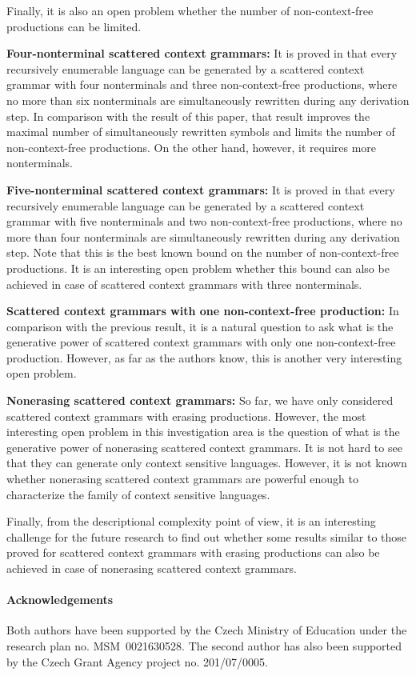 \documentclass[copyright]{eptcs}
\begin{document}
  Finally, it is also an open problem whether the number of non-context-free productions can be limited.

  {\bf Four-nonterminal scattered context grammars:}
  It is proved in \cite{masopustTCS} that every recursively enumerable language can be generated by a scattered context grammar with four nonterminals and three non-context-free productions, where no more than six nonterminals are simultaneously rewritten during any derivation step. In comparison with the result of this paper, that result improves the maximal number of simultaneously rewritten symbols and limits the number of non-context-free productions. On the other hand, however, it requires more nonterminals.

  {\bf Five-nonterminal scattered context grammars:}
  It is proved in \cite{vaszil} that every recursively enumerable language can be generated by a scattered context grammar with five nonterminals and two non-context-free productions, where no more than four nonterminals are simultaneously rewritten during any derivation step. Note that this is the best known bound on the number of non-context-free productions. It is an interesting open problem whether this bound can also be achieved in case of scattered context grammars with three nonterminals.

  {\bf Scattered context grammars with one non-context-free production:}
  In comparison with the previous result, it is a natural question to ask what is the generative power of scattered context grammars with only one non-context-free production. However, as far as the authors know, this is another very interesting open problem.

  {\bf Nonerasing scattered context grammars:}
  So far, we have only considered scattered context grammars with erasing productions. However, the most interesting open problem in this investigation area is the question of what is the generative power of nonerasing scattered context grammars. It is not hard to see that they can generate only context sensitive languages. However, it is not known whether nonerasing scattered context grammars are powerful enough to characterize the family of context sensitive languages.

  Finally, from the descriptional complexity point of view, it is an interesting challenge for the future research to find out whether some results similar to those proved for scattered context grammars with erasing productions can also be achieved in case of nonerasing scattered context grammars.


\paragraph{Acknowledgements}
  Both authors have been supported by the Czech Ministry of Education under the research plan no. MSM~0021630528. The second author has also been supported by the Czech Grant Agency project no. 201/07/0005.



\end{document}
